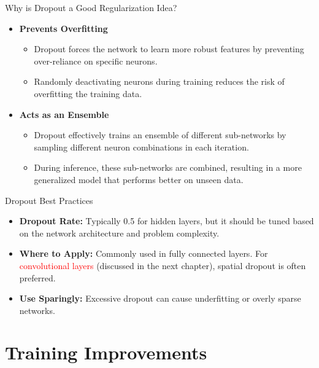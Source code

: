 \documentclass[serif, aspectratio=169]{beamer}
\begin{document}
\begin{frame}{Why is Dropout a Good Regularization Idea?}
    \begin{itemize}
        \item \textbf{Prevents Overfitting} 
        \begin{itemize}
            \item Dropout forces the network to learn more robust features by preventing over-reliance on specific neurons.
            \item Randomly deactivating neurons during training reduces the risk of overfitting the training data.
        \end{itemize}

        \item \textbf{Acts as an Ensemble}
        \begin{itemize}
            \item Dropout effectively trains an ensemble of different sub-networks by sampling different neuron combinations in each iteration.
            \item During inference, these sub-networks are combined, resulting in a more generalized model that performs better on unseen data.
        \end{itemize}
    \end{itemize}
\end{frame}


\begin{frame}{Dropout Best Practices}
    \begin{itemize}
        \item \textbf{Dropout Rate:} Typically 0.5 for hidden layers, but it should be tuned based on the network architecture and problem complexity.
        \item \textbf{Where to Apply:} Commonly used in fully connected layers. For \textcolor{red}{convolutional layers} (discussed in the next chapter), spatial dropout is often preferred.
        \item \textbf{Use Sparingly:} Excessive dropout can cause underfitting or overly sparse networks.
    \end{itemize}
\end{frame}



\section{Training Improvements}
\end{document}
